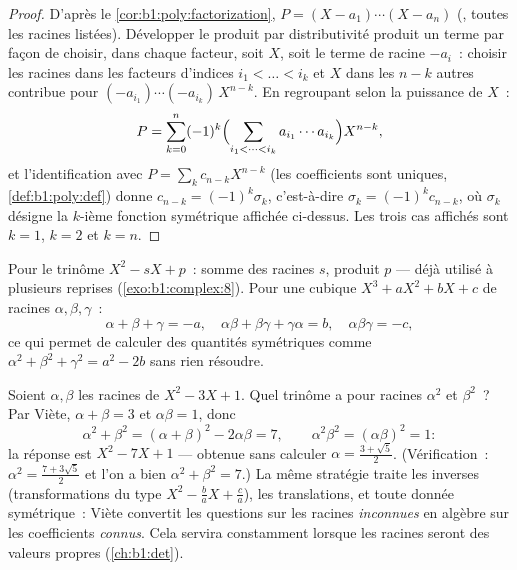\begin{proof}
D'après le \cref{cor:b1:poly:factorization}, $P = (X - a_1)\cdots(X -
a_n)$ (, toutes les racines listées). Développer le produit
par distributivité produit un terme par façon de choisir, dans
chaque facteur, soit $X$, soit le terme de racine $-a_i$~: choisir
les racines dans les facteurs d'indices $i_1 < \dots < i_k$ et $X$
dans les $n - k$ autres contribue pour
$(-a_{i_1})\cdots(-a_{i_k})\,X^{n-k}$. En regroupant selon la
puissance de $X$~:
\[
P = \sum_{k=0}^{n} (-1)^k
\Bigl(\sum_{i_1 < \dots < i_k} a_{i_1}\cdots a_{i_k}\Bigr)
X^{n-k} ,
\]
et l'identification avec $P = \sum_k c_{n-k}X^{n-k}$ (les
coefficients sont uniques, \cref{def:b1:poly:def}) donne $c_{n-k} =
(-1)^k \sigma_k$, c'est-à-dire $\sigma_k = (-1)^kc_{n-k}$, où
$\sigma_k$ désigne la $k$-ième fonction symétrique affichée
ci-dessus. Les trois cas affichés sont $k = 1$, $k = 2$ et $k = n$.
\end{proof}

\begin{example}\label{ex:b1:poly:vieta}
Pour le trinôme $X^2 - sX + p$~: somme des racines $s$, produit $p$
--- déjà utilisé à plusieurs reprises (\cref{exo:b1:complex:8}). Pour
une cubique  $X^3 + aX^2 + bX + c$ de racines $\alpha, \beta,
\gamma$~:
\[
\alpha + \beta + \gamma = -a,
\quad
\alpha\beta + \beta\gamma + \gamma\alpha = b,
\quad
\alpha\beta\gamma = -c ,
\]
ce qui permet de calculer des quantités symétriques comme $\alpha^2 +
\beta^2 + \gamma^2 = a^2 - 2b$ sans rien résoudre.
\end{example}

\begin{example}\label{ex:b1:poly:transformroots}
Soient $\alpha, \beta$ les racines de $X^2 - 3X + 1$. Quel trinôme
 a pour racines $\alpha^2$ et $\beta^2$~? Par Viète, $\alpha
+ \beta = 3$ et $\alpha\beta = 1$, donc
\[
\alpha^2 + \beta^2 = (\alpha+\beta)^2 - 2\alpha\beta = 7,
\qquad
\alpha^2\beta^2 = (\alpha\beta)^2 = 1 :
\]
la réponse est $X^2 - 7X + 1$ --- obtenue sans calculer $\alpha =
\frac{3 + \sqrt5}2$. (Vérification~: $\alpha^2 = \frac{7 +
3\sqrt5}2$ et l'on a bien $\alpha^2 + \beta^2 = 7$.) La même
stratégie traite les inverses (transformations du type $X^2 - \frac
ba X + \frac ca$), les translations, et toute donnée symétrique~:
Viète convertit les questions sur les racines \emph{inconnues} en
algèbre sur les coefficients \emph{connus}. Cela servira constamment
lorsque les racines seront des valeurs propres (\cref{ch:b1:det}).
\end{example}

